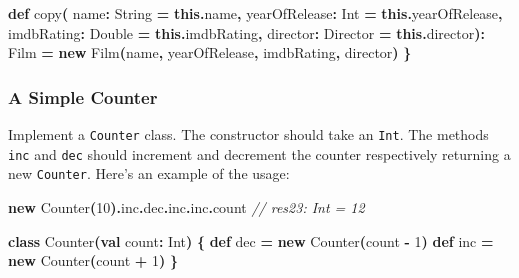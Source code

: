 \documentclass[11pt,a5paper,]{book}
\newenvironment{Shaded}{\begin{snugshade}}{\end{snugshade}}
\newcommand{\BuiltInTok}[1]{#1}
\newcommand{\CommentTok}[1]{\textcolor[rgb]{0.56,0.35,0.01}{\textit{#1}}}
\newcommand{\DecValTok}[1]{\textcolor[rgb]{0.00,0.00,0.81}{#1}}
\newcommand{\ExtensionTok}[1]{#1}
\newcommand{\FunctionTok}[1]{\textcolor[rgb]{0.00,0.00,0.00}{#1}}
\newcommand{\KeywordTok}[1]{\textcolor[rgb]{0.13,0.29,0.53}{\textbf{#1}}}
\newcommand{\NormalTok}[1]{#1}
\newcommand{\OperatorTok}[1]{\textcolor[rgb]{0.81,0.36,0.00}{\textbf{#1}}}
\begin{document}
\begin{Shaded}
\begin{Highlighting}[]
  \KeywordTok{def} \FunctionTok{copy}\OperatorTok{(}
\NormalTok{    name}\OperatorTok{:} \ExtensionTok{String} \OperatorTok{=} \KeywordTok{this}\OperatorTok{.}\NormalTok{name}\OperatorTok{,}
\NormalTok{    yearOfRelease}\OperatorTok{:} \BuiltInTok{Int} \OperatorTok{=} \KeywordTok{this}\OperatorTok{.}\NormalTok{yearOfRelease}\OperatorTok{,}
\NormalTok{    imdbRating}\OperatorTok{:} \ExtensionTok{Double} \OperatorTok{=} \KeywordTok{this}\OperatorTok{.}\NormalTok{imdbRating}\OperatorTok{,}
\NormalTok{    director}\OperatorTok{:}\NormalTok{ Director }\OperatorTok{=} \KeywordTok{this}\OperatorTok{.}\NormalTok{director}\OperatorTok{):}\NormalTok{ Film }\OperatorTok{=}
    \KeywordTok{new} \FunctionTok{Film}\OperatorTok{(}\NormalTok{name}\OperatorTok{,}\NormalTok{ yearOfRelease}\OperatorTok{,}\NormalTok{ imdbRating}\OperatorTok{,}\NormalTok{ director}\OperatorTok{)}
\OperatorTok{\}}
\end{Highlighting}
\end{Shaded}

\hypertarget{a-simple-counter}{%
\subsubsection{A Simple Counter}\label{a-simple-counter}}

Implement a \texttt{Counter} class. The constructor should take an
\texttt{Int}. The methods \texttt{inc} and \texttt{dec} should increment
and decrement the counter respectively returning a new \texttt{Counter}.
Here's an example of the usage:

\begin{Shaded}
\begin{Highlighting}[]
\KeywordTok{new} \FunctionTok{Counter}\OperatorTok{(}\DecValTok{10}\OperatorTok{).}\NormalTok{inc}\OperatorTok{.}\NormalTok{dec}\OperatorTok{.}\NormalTok{inc}\OperatorTok{.}\NormalTok{inc}\OperatorTok{.}\NormalTok{count}
\CommentTok{// res23: Int = 12}
\end{Highlighting}
\end{Shaded}

\begin{Shaded}
\begin{Highlighting}[]
\KeywordTok{class} \FunctionTok{Counter}\OperatorTok{(}\KeywordTok{val}\NormalTok{ count}\OperatorTok{:} \BuiltInTok{Int}\OperatorTok{)} \OperatorTok{\{}
  \KeywordTok{def}\NormalTok{ dec }\OperatorTok{=} \KeywordTok{new} \FunctionTok{Counter}\OperatorTok{(}\NormalTok{count }\OperatorTok{{-}} \DecValTok{1}\OperatorTok{)}
  \KeywordTok{def}\NormalTok{ inc }\OperatorTok{=} \KeywordTok{new} \FunctionTok{Counter}\OperatorTok{(}\NormalTok{count }\OperatorTok{+} \DecValTok{1}\OperatorTok{)}
\OperatorTok{\}}
\end{Highlighting}
\end{Shaded}
\end{document}
